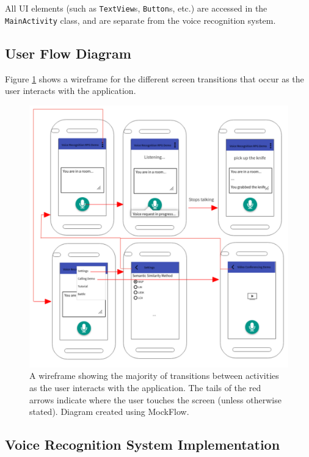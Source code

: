 \documentclass[11pt]{article}
\begin{document}
All UI elements (such as \texttt{TextView}s, \texttt{Button}s, etc.) are accessed in the \texttt{MainActivity} class, and are separate from the voice recognition system.

\subsection{User Flow Diagram}

Figure \ref{fig:wireframe} shows a wireframe for the different screen transitions that occur as the user interacts with the application.

\begin{figure}[H]
\begin{center}
  \includegraphics[width=\linewidth]{wireframe.pdf}
  \caption{A wireframe showing the majority of transitions between activities as the user interacts with the application. The tails of the red arrows indicate where the user touches the screen (unless otherwise stated). Diagram created using MockFlow.}
  \label{fig:wireframe}
  \end{center}
\end{figure}

\subsection{Voice Recognition System Implementation}
\end{document}

